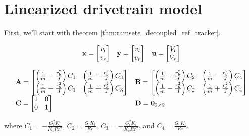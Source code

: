 \section{Linearized drivetrain model}

First, we'll start with theorem \ref{thm:ramsete_decoupled_ref_tracker}.

\begin{equation*}
  \begin{array}{ccc}
    \mathbf{x} =
    \begin{bmatrix}
      v_l \\
      v_r
    \end{bmatrix} &
    \mathbf{y} =
    \begin{bmatrix}
      v_l \\
      v_r
    \end{bmatrix} &
    \mathbf{u} =
    \begin{bmatrix}
      V_l \\
      V_r
    \end{bmatrix}
  \end{array}
\end{equation*}

\begin{equation}
  \begin{array}{ll}
    \mathbf{A} =
    \begin{bmatrix}
      \left(\frac{1}{m} + \frac{r_b^2}{J}\right) C_1 &
        \left(\frac{1}{m} - \frac{r_b^2}{J}\right) C_3 \\
      \left(\frac{1}{m} - \frac{r_b^2}{J}\right) C_1 &
        \left(\frac{1}{m} + \frac{r_b^2}{J}\right) C_3
    \end{bmatrix} &
    \mathbf{B} =
    \begin{bmatrix}
      \left(\frac{1}{m} + \frac{r_b^2}{J}\right) C_2 &
        \left(\frac{1}{m} - \frac{r_b^2}{J}\right) C_4 \\
      \left(\frac{1}{m} - \frac{r_b^2}{J}\right) C_2 &
        \left(\frac{1}{m} + \frac{r_b^2}{J}\right) C_4
    \end{bmatrix} \\
    \mathbf{C} =
    \begin{bmatrix}
      1 & 0 \\
      0 & 1 \\
    \end{bmatrix} &
    \mathbf{D} = \mathbf{0}_{2 \times 2}
  \end{array}
\end{equation}

where $C_1 = -\frac{G_l^2 K_t}{K_v R r^2}$, $C_2 = \frac{G_l K_t}{Rr}$,
$C_3 = -\frac{G_r^2 K_t}{K_v R r^2}$, and $C_4 = \frac{G_r K_t}{Rr}$.

